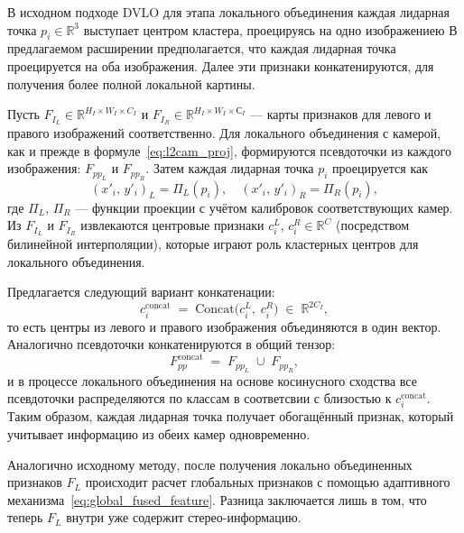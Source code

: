 В исходном подходе DVLO для этапа локального объединения
каждая лидарная точка $p_i \in \mathbb{R}^3$ выступает центром кластера, 
проецируясь на одно изображениею
В предлагаемом расширении предполагается, что 
каждая лидарная точка проецируется на оба изображения. 
Далее эти признаки конкатенируются, для получения более полной локальной картины.

Пусть ${F}_{I_L} \in \mathbb{R}^{H_I \times W_I \times C_I}$ и ${F}_{I_R} \in \mathbb{R}^{H_I \times W_I \times С_I}$
--- карты признаков для левого и правого изображений соответственно.
Для локального объединения с камерой, как и прежде в формуле~\eqref{eq:l2cam_proj}, формируются псевдоточки из каждого изображения: $F_{pp_L}$ и $F_{pp_R}$.
Затем каждая лидарная точка ${p}_i$ проецируется как 
\begin{equation*}
  (x'_i,\,y'_i)_L = \Pi_L({p}_i), 
  \quad
  (x'_i,\,y'_i)_R = \Pi_R({p}_i),
\end{equation*}
где $\Pi_L,\,\Pi_R$ --- функции проекции с учётом калибровок соответствующих камер. 
Из ${F}_{I_L}$ и ${F}_{I_R}$ извлекаются центровые признаки ${c}_i^L,\,{c}_i^R \in \mathbb{R}^{C}$ 
(посредством билинейной интерполяции), которые играют роль кластерных центров для локального объединения.

Предлагается следующий вариант конкатенации:
\begin{equation*}
  {c}_i^{\mathrm{concat}} 
  \;=\;
  \mathrm{Concat}\bigl({c}_i^L,\;{c}_i^R \bigr)
  \;\in\;\mathbb{R}^{2C_I},
\end{equation*}
то есть центры из левого и правого изображения объединяются в один вектор. 
Аналогично псевдоточки конкатенируются в общий тензор:
\[
  F_{pp}^{\mathrm{concat}} 
  \;=\;
  F_{pp_L} \;\cup\; F_{pp_R},
\]
и в процессе локального объединения на основе косинусного сходства 
все псевдоточки распределяются по классам в соответсвии с близостью к ${c}_i^{\mathrm{concat}}$. 
Таким образом, каждая лидарная точка получает обогащённый признак, 
который учитывает информацию из обеих камер одновременно.

Аналогично исходному методу, после получения локально объединенных признаков ${F}_L$ происходит расчет глобальных признаков
с помощью адаптивного механизма~\eqref{eq:global_fused_feature}. 
Разница заключается лишь в том, что теперь ${F}_L$ внутри уже содержит стерео-информацию. 